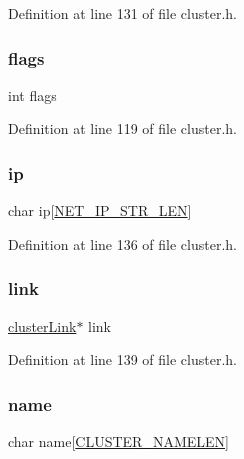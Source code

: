 Definition at line 131 of file cluster.\+h.

\mbox{\label{structcluster_node_ac8bf36fe0577cba66bccda3a6f7e80a4}} 
\subsubsection{\texorpdfstring{flags}{flags}}
{\footnotesize\ttfamily int flags}



Definition at line 119 of file cluster.\+h.

\mbox{\label{structcluster_node_a9de2afd4e77c16f677244d244270b605}} 
\subsubsection{\texorpdfstring{ip}{ip}}
{\footnotesize\ttfamily char ip\mbox{[}\hyperlink{server_8h_ad97c5405ed22a94e9fcc10fba577d6c0}{N\+E\+T\+\_\+\+I\+P\+\_\+\+S\+T\+R\+\_\+\+L\+EN}\mbox{]}}



Definition at line 136 of file cluster.\+h.

\mbox{\label{structcluster_node_a6cd8af29efc723c4b150e027c8106322}} 
\subsubsection{\texorpdfstring{link}{link}}
{\footnotesize\ttfamily \hyperlink{structcluster_link}{cluster\+Link}$\ast$ link}



Definition at line 139 of file cluster.\+h.

\mbox{\label{structcluster_node_a5d3e2cfb46d2a665115ea2b362063396}} 
\subsubsection{\texorpdfstring{name}{name}}
{\footnotesize\ttfamily char name\mbox{[}\hyperlink{cluster_8h_ace7a882972eff7149675252938643b6e}{C\+L\+U\+S\+T\+E\+R\+\_\+\+N\+A\+M\+E\+L\+EN}\mbox{]}}



